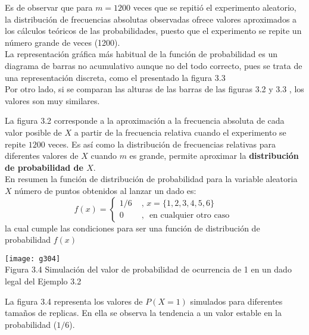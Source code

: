 \documentclass[base=hide,12pt]{elegantbook}
\begin{document}
Es de observar que para $m=1200$ veces que se repitió el experimento aleatorio, la distribución de frecuencias absolutas observadas ofrece valores aproximados a los cálculos teóricos de las probabilidades, puesto que el experimento se repite un número grande de veces (1200).\\


 La representación gráfica más habitual de la función de probabilidad es un diagrama de barras no acumulativo aunque no del todo correcto, pues se trata de una representación discreta, como el presentado la figura 3.3\\

Por otro lado, si se comparan las alturas de las barras de las figuras 3.2  y 3.3 , los valores son muy similares.

La figura 3.2 corresponde a la aproximación a la frecuencia absoluta de cada valor posible de $X$ a partir de la frecuencia relativa cuando el experimento  se repite $1200$ veces. Es así como la distribución de frecuencias relativas para diferentes valores de $X$ cuando $m$ es grande, permite aproximar la {\bf distribución de probabilidad de $X$}. \\

%
En resumen la función de distribución de probabilidad para la variable aleatoria $X$ número de puntos obtenidos al lanzar un dado es:\\
%
$$f(x) = 
\left \{ \begin{matrix} 
	1/6 & \mbox{ , } x=\{1,2,3,4,5,6\} \\
	0 & \mbox{ , }  \mbox{ en cualquier otro caso }
\end{matrix}\right. $$
%
la cual cumple las condiciones para ser una función de distribución de probabilidad $f(x)$\\

\begin{center}
\texttt{[image: g304]}\\
Figura 3.4 Simulación del valor de probabilidad de ocurrencia de 1 en un dado legal del  Ejemplo 3.2
\end{center}

La figura 3.4 representa los valores de $P(X=1)$ simulados para diferentes tamaños de replicas. En ella se observa la tendencia a un valor estable en la probabilidad ($1/6$).\\
\end{document}
